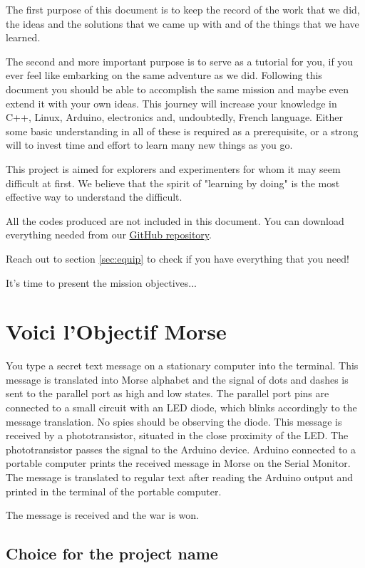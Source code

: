 \documentclass[12pt]{report}
\begin{document}
The first purpose of this document is to keep the record of the work that we did, the ideas and the solutions that we came up with and of the things that we have learned.

The second and more important purpose is to serve as a tutorial for you, if you ever feel like embarking on the same adventure as we did. Following this document you should be able to accomplish the same mission and maybe even extend it with your own ideas. This journey will increase your knowledge in C++, Linux, Arduino, electronics and, undoubtedly, French language. Either some basic understanding in all of these is required as a prerequisite, or a strong will to invest time and effort to learn many new things as you go.

This project is aimed for explorers and experimenters for whom it may seem difficult at first. We believe that the spirit of "learning by doing" is the most effective way to understand the difficult.

All the codes produced are not included in this document. You can download everything needed from our \href{https://github.com/camillejr/objectif_morse}{GitHub repository}.

Reach out to section \ref{sec:equip} to check if you have everything that you need!

It's time to present the mission objectives...

\section{Voici l'Objectif Morse}

You type a secret text message on a stationary computer into the terminal. This message is translated into Morse alphabet and the signal of dots and dashes is sent to the parallel port as high and low states. The parallel port pins are connected to a small circuit with an LED diode, which blinks accordingly to the message translation. No spies should be observing the diode. This message is received by a phototransistor, situated in the close proximity of the LED. The phototransistor passes the signal to the Arduino device. Arduino connected to a portable computer prints the received message in Morse on the Serial Monitor. The message is translated to regular text after reading the Arduino output and printed in the terminal of the portable computer. 

The message is received and the war is won.

\subsection{Choice for the project name}
\end{document}
